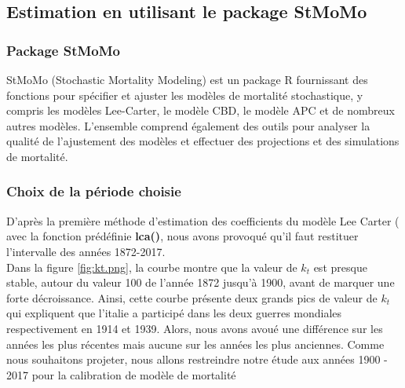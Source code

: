 \documentclass[french]{report}
\begin{document}
\subsection{Estimation en utilisant le package StMoMo}

\subsubsection{Package StMoMo}

StMoMo (Stochastic Mortality Modeling) est un package R fournissant des fonctions pour spécifier et ajuster les modèles de mortalité stochastique, y compris les modèles Lee-Carter, le modèle CBD, le modèle APC et de nombreux autres modèles. L'ensemble comprend également des outils pour analyser la qualité de l'ajustement des modèles et effectuer des projections et des simulations de mortalité.\cite{StMoMo}

\subsubsection{Choix de la période choisie}
D'après la première méthode d'estimation des coefficients du modèle Lee Carter ( avec la fonction prédéfinie \textbf{lca()}, nous avons provoqué qu'il faut restituer l'intervalle des années 1872-2017.
\\








Dans la figure \ref{fig:kt.png}, la courbe montre que la valeur de ${k}_{t}$ est presque stable, autour du valeur 100 de l'année 1872 jusqu'à 1900, avant de marquer une forte décroissance.
Ainsi, cette courbe présente deux grands pics de valeur de ${k}_{t}$ qui expliquent que l'italie a participé dans les deux guerres mondiales respectivement en 1914 et 1939.
Alors, nous avons avoué une différence sur les années les plus récentes mais aucune sur les années les plus anciennes. 
Comme nous souhaitons projeter, nous allons restreindre notre étude aux années 1900 - 2017 pour la calibration de modèle de mortalité
\end{document}
